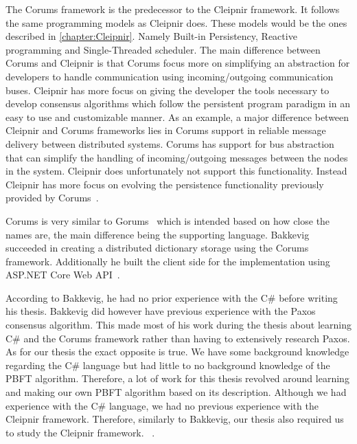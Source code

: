 The Corums framework is the predecessor to the Cleipnir framework. It follows the same programming models as Cleipnir does. These models would be the ones described in \autoref{chapter:Cleipnir}. Namely Built-in Persistency, Reactive programming and Single-Threaded scheduler.
The main difference between Corums and Cleipnir is that Corums focus more on simplifying an abstraction for developers to handle communication using incoming/outgoing communication buses. Cleipnir has more focus on giving the developer the tools necessary to develop consensus algorithms which follow the persistent program paradigm in an easy to use and customizable manner. As an example, a major difference between Cleipnir and Corums frameworks lies in Corums support in reliable message delivery between distributed systems. Corums has support for bus abstraction that can simplify the handling of incoming/outgoing messages between the nodes in the system. Cleipnir does unfortunately not support this functionality. Instead Cleipnir has more focus on evolving the persistence functionality previously provided by Corums~\cites[p.~6-7]{PAPER:PaxosCleipnir}{DOC:Cleipnir}.
 
Corums is very similar to Gorums~\cites[p.~2]{WEB:Gorums}[p.~22]{PAPER:EivindPaper} which is intended based on how close the names are, the main difference being the supporting language.
Bakkevig succeeded in creating a distributed dictionary storage using the Corums framework. Additionally he built the client side for the implementation using ASP.NET Core Web API~\cite{WEB:ASPNetCoreAPI}.
 
According to Bakkevig, he had no prior experience with the C\# before writing his thesis. Bakkevig did however have previous experience with the Paxos consensus algorithm. This made most of his work during the thesis about learning C\# and the Corums framework rather than having to extensively research Paxos. As for our thesis the exact opposite is true. We have some background knowledge regarding the C\# language but had little to no background knowledge of the PBFT algorithm. Therefore, a lot of work for this thesis revolved around learning and making our own PBFT algorithm based on its description. Although we had experience with the C\# language, we had no previous experience with the Cleipnir framework. Therefore, similarly to Bakkevig, our thesis also required us to study the Cleipnir framework. ~\cite[p.~8]{PAPER:EivindPaper}.

